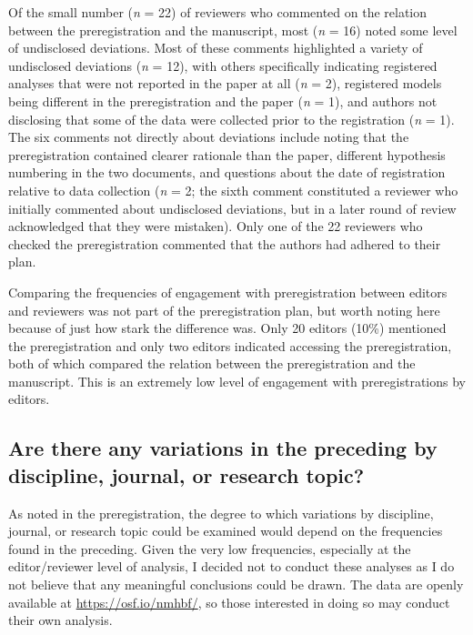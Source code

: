 \documentclass[authordate, empirical]{jote-new-article}
\begin{document}
	Of the small number (\emph{n} = 22) of reviewers who commented on the relation between the preregistration and the manuscript, most (\emph{n} = 16) noted some level of undisclosed deviations. Most of these comments highlighted a variety of undisclosed deviations (\emph{n} = 12), with others specifically indicating registered analyses that were not reported in the paper at all (\emph{n} = 2), registered models being different in the preregistration and the paper (\emph{n} = 1), and authors not disclosing that some of the data were collected prior to the registration (\emph{n} = 1). The six comments not directly about deviations include noting that the preregistration contained clearer rationale than the paper, different hypothesis numbering in the two documents, and questions about the date of registration relative to data collection (\emph{n} = 2; the sixth comment constituted a reviewer who initially commented about undisclosed deviations, but in a later round of review acknowledged that they were mistaken). Only one of the 22 reviewers who checked the preregistration commented that the authors had adhered to their plan.



	Comparing the frequencies of engagement with preregistration between editors and reviewers was not part of the preregistration plan, but worth noting here because of just how stark the difference was. Only 20 editors (10\%) mentioned the preregistration and only two editors indicated accessing the preregistration, both of which compared the relation between the preregistration and the manuscript. This is an extremely low level of engagement with preregistrations by editors.



	\subsection{Are there any variations in the preceding by discipline, journal, or research topic?}



	As noted in the preregistration, the degree to which variations by discipline, journal, or research topic could be examined would depend on the frequencies found in the preceding. Given the very low frequencies, especially at the editor/reviewer level of analysis, I decided not to conduct these analyses as I do not believe that any meaningful conclusions could be drawn. The data are openly available at \url{https://osf.io/nmhbf/}, so those interested in doing so may conduct their own analysis.
\end{document}

